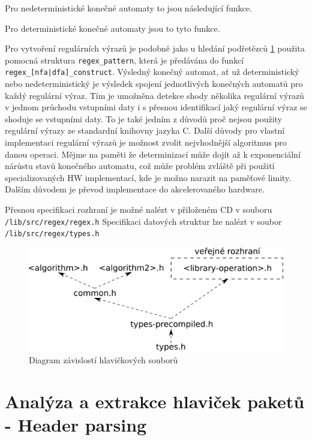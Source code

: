 Pro nedeterministické konečné automaty to jsou následující funkce.

Pro deterministické konečné automaty jsou to tyto funkce.

Pro vytvoření regulárních výrazů je podobně jako u hledání podřetězců \ref{}
použita pomocná struktura \texttt{regex\_pattern}, která je předávána do funkcí \texttt{regex\_[nfa|dfa]\_construct}.
Výsledný konečný automat, ať už deterministický nebo nedeterministický je výsledek spojení jednotlivých
konečných automatů pro každý regulární výraz. Tím je umožněna detekce shody několika
regulární výrazů v jednom průchodu vstupními daty i s přesnou identifikací jaký regulární
výraz se shoduje se vstupními daty. To je také jedním z důvodů proč nejsou použity regulární výrazy ze standardní
knihovny jazyka C.
Další důvody pro vlastní implementaci regulární výrazů je možnost zvolit nejvhodnější algoritmus pro danou operaci.
Mějme na paměti že determinizací může dojít až k exponenciální nárůstu stavů konečného automatu, což může problém
zvláště při použití specializovaných HW implementací, kde je možno narazit na paměťové limity.
Dalším důvodem je převod implementace do akcelerovaného hardware.


Přesnou specifikaci rozhraní je možné nalézt v přiloženém CD v souboru \texttt{/lib/src/regex/regex.h}
Specifikaci datových struktur lze nalézt v soubor \texttt{/lib/src/regex/types.h}

\begin{figure}[!htbp]
	\centering
	\includegraphics[scale=.25]{fig/header-dependencies.pdf}
	\caption{Diagram závislostí hlavičkových souborů}
\end{figure}\label{fig:header-dependecies}

\section{Analýza a extrakce hlaviček paketů - Header parsing} %

